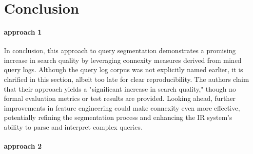 \section{Conclusion} \label{conclusion}

\paragraph*{approach 1}
In conclusion, this approach to query segmentation demonstrates a promising increase in search quality by leveraging connexity measures derived from mined query logs. Although the query log corpus was not explicitly named earlier, it is clarified in this section, albeit too late for clear reproducibility. The authors claim that their approach yields a "significant increase in search quality," though no formal evaluation metrics or test results are provided. Looking ahead, further improvements in feature engineering could make connexity even more effective, potentially refining the segmentation process and enhancing the IR system's ability to parse and interpret complex queries.

\paragraph*{approach 2}